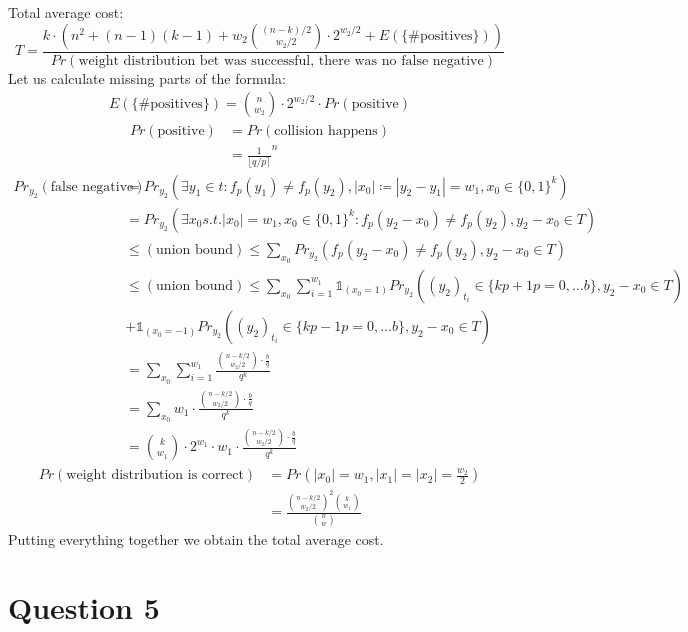 \documentclass[12pt]{article}
\begin{document}
Total average cost:
\[
    T = \frac{k \cdot (n^2 + (n-1)(k-1) + w_2\binom{(n-k)/2}{w_2/2} \cdot 2^{w_2/2} + E(\{\text{\# positives}\}))}{Pr(\text{weight distribution bet was successful, there was no false negative})}
\]
Let us calculate missing parts of the formula:
\[
\begin{split}
    E(\{\text{\# positives}\}) = \binom{n}{w_2} \cdot 2^{w_2/2} \cdot Pr(\text{positive})
\end{split}
\]
\[
\begin{split}
    Pr(\text{positive}) & = Pr(\text{collision happens}) \\
    & = \frac{1}{\lfloor q/p \rceil}^{n}
\end{split}
\]
\[
\begin{split}
    Pr_{y_2}(\text{false negative}) & = Pr_{y_2}(\exists y_1 \in t: f_p(y_1) \neq f_p(y_2), |x_0| \coloneqq |y_2 - y_1| = w_1, x_0 \in \{0,1\}^{k}) \\
    & = Pr_{y_2}(\exists x_0 s.t. |x_0| = w_1, x_0 \in\{0,1\}^{k}: f_p(y_2 - x_0) \neq f_p(y_2), y_2 - x_0 \in T) \\
    & \leq (\text{union bound}) \leq \sum_{x_0} Pr_{y_2}(f_p(y_2 - x_0) \neq f_p(y_2), y_2 - x_0 \in T) \\
    & \leq (\text{union bound}) \leq \sum_{x_0} \sum_{i = 1}^{w_1} \mathds{1}_{(x_0 = 1)}Pr_{y_2}((y_2)_{t_i} \in \{kp+1 p=0, \dots b\}, y_2 - x_0 \in T) \\
    & + \mathds{1}_{(x_0 = -1)}Pr_{y_2}((y_2)_{t_i} \in \{kp-1 p=0, \dots b\}, y_2 - x_0 \in T) \\
    & = \sum_{x_0} \sum_{i = 1}^{w_1} \frac{\binom{n-k/2}{w_2/2} \cdot \frac{b}{q}}{q^k} \\
    & = \sum_{x_0} w_1 \cdot \frac{\binom{n-k/2}{w_2/2} \cdot \frac{b}{q}}{q^k} \\
    & = \binom{k}{w_1} \cdot 2^{w_1} \cdot w_1 \cdot \frac{\binom{n-k/2}{w_2/2} \cdot \frac{b}{q}}{q^k}
\end{split}
\]
\[
\begin{split}
    Pr(\text{weight distribution is correct}) & = Pr(|x_0| = w_1, |x_1| = |x_2| = \frac{w_2}{2}) \\
    & = \frac{\binom{n-k/2}{w_2/2}^{2}\binom{k}{w_1}}{\binom{n}{w}}
\end{split}
\]
Putting everything together we obtain the total average cost.

\section{Question 5}
\end{document}
